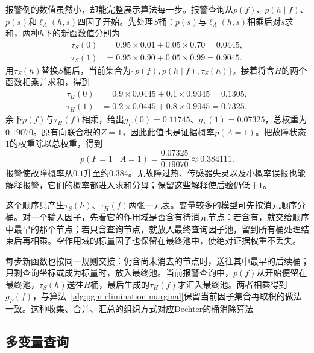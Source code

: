 报警例的数值虽然小，却能完整展示算法每一步。报警查询从$p(f)$、$p(h\mid f)$、$p(s)$和$\ell_A(h,s)$四因子开始。先处理$S$桶：$p(s)$与$\ell_A(h,s)$相乘后对$s$求和，两种$h$下的新函数值分别为
\begin{equation}
  \begin{aligned}
    \tau_S(0)&=0.95\times0.01+0.05\times0.70=0.0445,\\
    \tau_S(1)&=0.95\times0.90+0.05\times0.99=0.9045.
  \end{aligned}
  \label{eq:pgm-elimination-alarm-s}
\end{equation}
用$\tau_S(h)$替换$S$桶后，当前集合为$\{p(f),p(h\mid f),\tau_S(h)\}$。接着将含$H$的两个函数相乘并求和，得到
\begin{equation}
  \begin{aligned}
    \tau_H(0)&=0.9\times0.0445+0.1\times0.9045=0.1305,\\
    \tau_H(1)&=0.2\times0.0445+0.8\times0.9045=0.7325.
  \end{aligned}
  \label{eq:pgm-elimination-alarm-h}
\end{equation}
余下$p(f)$与$\tau_H(f)$相乘，给出$g_F(0)=0.11745$、$g_F(1)=0.07325$，总权重为$0.19070$。原有向联合积的$Z=1$，因此此值也是证据概率$p(A=1)$。把故障状态$1$的权重除以总权重，得到
\begin{equation}
  p(F=1\mid A=1)
  =\frac{0.07325}{0.19070}
  \approx0.384111.
  \label{eq:pgm-elimination-alarm-posterior}
\end{equation}
报警使故障概率从$0.1$升至约$0.384$。无故障过热、传感器失灵以及小概率误报也能解释报警，它们的概率都进入求和分母；保留这些解释使后验仍低于$1$。

这个顺序只产生$\tau_S(h)$、$\tau_H(f)$两张一元表。变量较多的模型可先按消元顺序分桶。对一个输入因子，先看它的作用域是否含有待消元节点：若含有，就交给顺序中最早的那个节点；若只含查询节点，就放入最终查询因子池，留到所有桶处理结束后再相乘。空作用域的标量因子也保留在最终池中，使绝对证据权重不丢失。

每步新函数也按同一规则交接：仍含尚未消去的节点时，送往其中最早的后续桶；只剩查询坐标或成为标量时，放入最终池。当前报警查询中，$p(f)$从开始便留在最终池，$\tau_S(h)$送往$H$桶，最后生成的$\tau_H(f)$才汇入最终池。两者相乘得到$g_F(f)$，与算法~\ref{alg:pgm-elimination-marginal}保留当前因子集合再取积的做法一致。这种收集、合并、汇总的组织方式对应Dechter的桶消除算法

\subsection{多变量查询}
\label{sec:pgm-elimination-multivariate-query}

